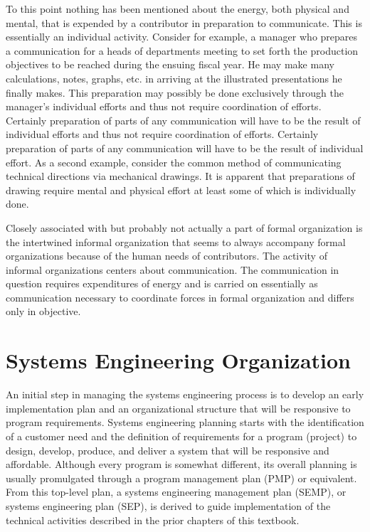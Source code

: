To this point nothing has been mentioned about the energy, both physical and mental, that is expended by a contributor in preparation to communicate. This is essentially an individual activity. Consider for example, a manager who prepares a communication for a heads of departments meeting to set forth the production objectives to be reached during the ensuing fiscal year. He may make many calculations, notes, graphs, etc. in arriving at the illustrated presentations he finally makes. This preparation may possibly be done exclusively through the manager’s individual efforts and thus not require coordination of efforts. Certainly preparation of parts of any communication will have to be the result of individual efforts and thus not require coordination of efforts. Certainly preparation of parts of any communication will have to be the result of individual effort. As a second example, consider the common method of communicating technical directions via mechanical drawings. It is apparent that preparations of drawing require mental and physical effort at least some of which is individually done.

Closely associated with but probably not actually a part of formal organization is the intertwined informal organization that seems to always accompany formal organizations because of the human needs of contributors. The activity of informal organizations centers about communication. The communication in question requires expenditures of energy and is carried on essentially as communication necessary to coordinate forces in formal organization and differs only in objective.


\section{Systems Engineering Organization}

An initial step in managing the systems engineering process is to develop an early implementation plan and an organizational structure that will be responsive to program requirements. Systems engineering planning starts with the identification of a customer need and the definition of requirements for a program (project) to design, develop, produce, and deliver a system that will be responsive and affordable. Although every program is somewhat different, its overall planning is usually promulgated through a program management plan (PMP) or equivalent. From this top-level plan, a systems engineering management plan (SEMP), or systems engineering plan (SEP), is derived to guide implementation of the technical activities described in the prior chapters of this textbook.

